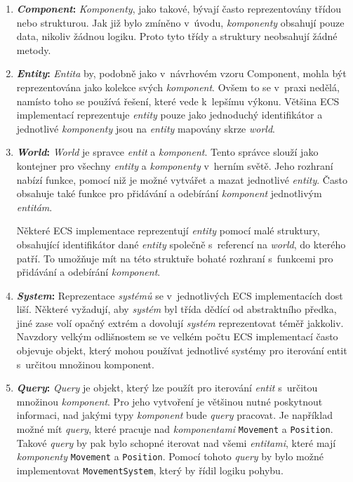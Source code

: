 \begin{enumerate}
    \item \textbf{\textit{Component}:} \textit{Komponenty}, jako takové, bývají často reprezentovány třídou nebo strukturou. Jak již bylo zmíněno v~úvodu, \textit{komponenty} obsahují pouze data, nikoliv žádnou logiku. Proto tyto třídy a struktury neobsahují žádné metody.

    \item \textbf{\textit{Entity}:} \textit{Entita} by, podobně jako v~návrhovém vzoru Component, mohla být reprezentována jako kolekce svých \textit{komponent}. Ovšem to se v~praxi nedělá, namísto toho se používá řešení, které vede k~lepšímu výkonu. Většina ECS implementací reprezentuje \textit{entity} pouze jako jednoduchý identifikátor a jednotlivé \textit{komponenty} jsou na \textit{entity} mapovány skrze \textit{world}.

    \item \textbf{\textit{World}:} \textit{World} je spravce \textit{entit} a \textit{komponent}. Tento správce slouží jako kontejner pro všechny \textit{entity} a \textit{komponenty} v~herním světě. Jeho rozhraní nabízí funkce, pomocí niž je možné vytvářet a mazat jednotlivé \textit{entity}. Často obsahuje také funkce pro přidávání a odebírání \textit{komponent} jednotlivým \textit{entitám}.

    Některé ECS implementace reprezentují \textit{entity} pomocí malé struktury, obsahující identifikátor dané \textit{entity} společně s~referencí na \textit{world}, do kterého patří. To umožňuje mít na této struktuře bohaté rozhraní s~funkcemi pro přidávání a odebírání \textit{komponent}.

    \item \textbf{\textit{System}:} Reprezentace \textit{systémů} se v~jednotlivých ECS implementacích dost liší. Některé vyžadují, aby \textit{systém} byl třída dědící od abstraktního předka, jiné zase volí opačný extrém a dovolují \textit{systém} reprezentovat téměř jakkoliv. Navzdory velkým odlišnostem se ve velkém počtu ECS implementací často objevuje objekt, který mohou používat jednotlivé systémy pro iterování entit s~určitou množinou komponent.

    \item \textbf{\textit{Query}:} \textit{Query} je objekt, který lze použít pro iterování \textit{entit} s~určitou množinou \textit{komponent}. Pro jeho vytvoření je většinou nutné poskytnout informaci, nad jakými typy \textit{komponent} bude \textit{query} pracovat. Je například možné mít \textit{query}, které pracuje nad \textit{komponentami} \verb|Movement| a \verb|Position|. Takové \textit{query} by pak bylo schopné iterovat nad všemi \textit{entitami}, které mají \textit{komponenty} \verb|Movement| a \verb|Position|. Pomocí tohoto \textit{query} by bylo možné implementovat \verb|MovementSystem|, který by řídil logiku pohybu.
\end{enumerate}

